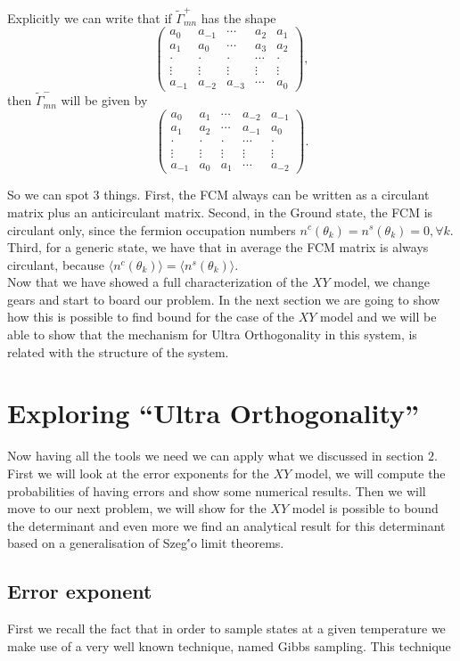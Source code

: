 Explicitly we can write that if $\tilde{\Gamma}^{+}_{mn}$ has the shape
\begin{equation}
\left(\begin{array}{ccccc}
a_{0} & a_{-1} & \cdots & a_{2} & a_{1} \\
a_{1} & a_{0} & \cdots & a_{3} & a_{2} \\
\cdot & \cdot & \cdot & \cdots & \cdot \\
\vdots & \vdots & \vdots & \vdots & \vdots \\
a_{-1} & a_{-2} & a_{-3} & \cdots & a_{0}
\end{array}\right),
\end{equation}
then $\tilde{\Gamma}^{-}_{mn}$ will be given by
\begin{equation}
\left(\begin{array}{ccccc}
a_{0} & a_{1} & \cdots & a_{-2} & a_{-1} \\
a_{1} & a_{2} & \cdots & a_{-1} & a_{0} \\
\cdot & \cdot & \cdot & \cdots & \cdot \\
\vdots & \vdots & \vdots & \vdots & \vdots \\
a_{-1} & a_{0} & a_{1} & \cdots & a_{-2}
\end{array}\right).
\end{equation}

So we can spot 3 things. First, the FCM always can be written as a circulant matrix plus an anticirculant matrix. Second, in the Ground state, the FCM is circulant only, since the fermion occupation numbers $n^{c}\left(\theta_{k}\right)=n^{s}\left(\theta_{k}\right)=0, \forall k$. Third, for a generic state, we have that in average the FCM matrix is always circulant, because $\langle n^{c}\left(\theta_{k}\right)\rangle=\langle n^{s}\left(\theta_{k}\right)\rangle$.\\
Now that we have showed a full characterization of the $XY$ model, we change gears and start to board our problem. In the next section we are going to show how this is possible to find bound for the case of the $XY$ model and we will be able to show that the mechanism for Ultra Orthogonality in this system, is related with the structure of the system.


\section{Exploring ``Ultra Orthogonality''}
Now having all the tools we need we can apply what we discussed in section $2$. First we will look at the error exponents for the $XY$ model, we will compute the probabilities of having errors and show some numerical results. Then we will move to our next problem, we will show for the $XY$ model is possible to bound the determinant and even more we find an analytical result for this determinant based on a generalisation of Szeg\''{o} limit theorems. 

\subsection{Error exponent}

First we recall the fact that in order to sample states at a given temperature we make use of a very well known technique, named Gibbs sampling. This technique 





